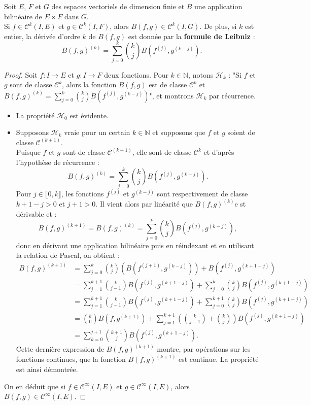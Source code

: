 \documentclass[french]{article}
\newcommand{\N}{\mathbb{N}}
\theoremstyle{plain}
\theoremstyle{definition}
\theoremstyle{remark}
\begin{document}
\begin{prop}%
	Soit $E$, $F$ et $G$ des espaces vectoriels de dimension finie et $B$ une application bilinéaire de $E\times F$ dans $G$.\\
	Si $f\in\mathcal{C}^k(I,E)$ et $g\in\mathcal{C}^k(I,F)$, alors $B(f,g)\in\mathcal{C}^k(I,G)$. De plus, si $k$ est entier, la dérivée d'ordre $k$ de $B(f,g)$ est donnée par la \textbf{formule de Leibniz} :
	$$B(f,g)^{(k)}=\sum_{j=0}^{k}\binom{k}{j}B(f^{(j)},g^{(k-j)}).$$
\end{prop}
\begin{proof}
	Soit $f:I\to E$ et $g:I\to F$ deux fonctions. Pour $k\in\N$, notons $\mathcal{H}_k$ : "Si $f$ et $g$ sont de classe $\mathcal{C}^k$, alors la fonction $B(f,g)$ est de classe $\mathcal{C}^k$ et $B(f,g)^{(k)}=\sum_{j=0}^{k}\binom{k}{j}B(f^{(j)},g^{(k-j)})$", et montrons $\mathcal{H}_k$ par récurrence.
	\begin{itemize}
		\item La propriété $\mathcal{H}_0$ est évidente.
		\item Supposons $\mathcal{H}_k$ vraie pour un certain $k\in\N$ et supposons que $f$ et $g$ soient de classe $\mathcal{C}^{(k+1)}$. \\
		Puisque $f$ et $g$ sont de classe $\mathcal{C}^{(k+1)}$, elle sont de classe $\mathcal{C}^k$ et d'après l'hypothèse de récurrence :
		$$B(f,g)^{(k)}=\sum_{j=0}^{k}\binom{k}{j}B(f^{(j)},g^{(k-j)}).$$
		Pour $j\in\llbracket0,k\rrbracket$, les fonctions $f^{(j)}$ et $g^{(k-j)}$ sont respectivement de classe $k+1-j>0$ et $j+1>0$. Il vient alors par linéarité que $B(f,g)^{(k)}$e st dérivable et :
		$$B(f,g)^{(k+1)}=B(f,g)^{(k)}=\sum_{j=0}^{k}\binom{k}{j}B(f^{(j)},g^{(k-j)}),$$ donc en dérivant une application bilinéaire puis en réindexant et en utilisant la relation de Pascal, on obtient :
		\begin{align*}
			B(f,g)^{(k+1)}&=\sum_{j=0}^{k}\binom{k}{j}(B(f^{(j+1)},g^{(k-j)}))+B(f^{(j)},g^{(k+1-j)})\\
			&=\sum_{j=1}^{k+1}\binom{k}{j-1}B(f^{(j)},g^{(k+1-j)})+\sum_{j=0}^{k}\binom{k}{j}B(f^{(j)},g^{(k+1-j)})\\
			&=\sum_{j=1}^{k+1}\binom{k}{j-1}B(f^{(j)},g^{(k+1-j)})+\sum_{j=0}^{k+1}\binom{k}{j}B(f^{(j)},g^{(k+1-j)})\\
			&=\binom{k}{0}B(f,g^{(k+1)})+\sum_{j=1}^{k+1}\left(\binom{k}{j-1}+\binom{k}{j}\right)B(f^{(j)},g^{(k+1-j)})\\
			&=\sum_{k=0}^{j+1}\binom{k+1}{j}B(f^{(j)},g^{(k+1-j)}).
		\end{align*}
		Cette dernière expression de $B(f,g)^{(k+1)}$ montre, par opérations sur les fonctions continues, que la fonction $B(f,g)^{(k+1)}$ est continue. La propriété est ainsi démontrée.
	\end{itemize}
	On en déduit que si $f\in\mathcal{C}^\infty(I,E)$ et $g\in\mathcal{C}^\infty(I,E)$, alors $B(f,g)\in\mathcal{C}^\infty(I,E)$.
\end{proof}
\end{document}
